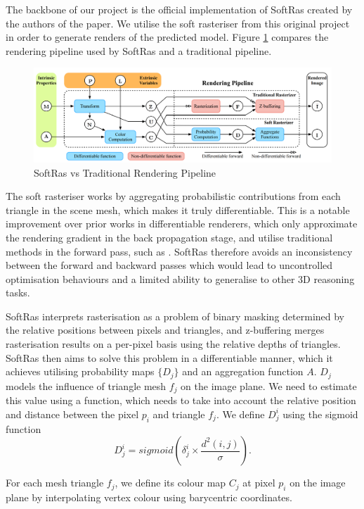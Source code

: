 \documentclass{article}
\begin{document}
The backbone of our project is the official implementation of SoftRas created by the authors of the paper. We utilise the soft rasteriser from this original project in order to generate renders of the predicted model. Figure \ref{softraspipe} compares the rendering pipeline used by SoftRas and a traditional pipeline.

\begin{figure}[h!]
  \centering
  \includegraphics[width=\textwidth]{images/softraspipeline.png}
  \caption{SoftRas vs Traditional Rendering Pipeline \parencite{softras}}
  \label{softraspipe}
\end{figure}

The soft rasteriser works by aggregating probabilistic contributions from each triangle in the scene mesh, which makes it truly differentiable. This is a notable improvement over prior works in differentiable renderers, which only approximate the rendering gradient in the back propagation stage, and utilise traditional methods in the forward pass, such as \cite{neural3dmeshrenderer}. SoftRas therefore avoids an inconsistency between the forward and backward passes which would lead to uncontrolled optimisation behaviours and a limited ability to generalise to other 3D reasoning tasks.

SoftRas interprets rasterisation as a problem of binary masking determined by the relative positions between pixels and triangles, and z-buffering merges rasterisation results on a per-pixel basis using the relative depths of triangles. SoftRas then aims to solve this problem in a differentiable manner, which it achieves utilising probability maps $\{D_j\}$ and an aggregation function $A$. $D_j$ models the influence of triangle mesh $f_j$ on the image plane. We need to estimate this value using a function, which needs to take into account the relative position and distance between the pixel $p_i$ and triangle $f_j$. We define $D_j^i$ using the sigmoid function \[D^i_j = sigmoid(\delta^i_j \times \frac{d^2(i,j)}{\sigma})\text{.}\]

For each mesh triangle $f_j$, we define its colour map $C_j$ at pixel $p_i$ on the image plane by interpolating vertex colour using barycentric coordinates.
\end{document}
